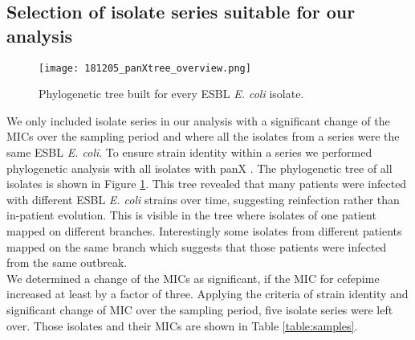 \subsection{Selection of isolate series suitable for our analysis}
\begin{figure}
	\texttt{[image: 181205\_panXtree\_overview.png]}
	\caption{Phylogenetic tree built for every ESBL \textit{E. coli} isolate.}
	\label{figure:panX}
\end{figure}
We only included isolate series in our analysis with a significant change of the MICs over the sampling period and where all the isolates from a series were the same ESBL \textit{E. coli}. To ensure strain identity within a series we performed phylogenetic analysis with all isolates with panX \cite{ding_panx:_2018}.    
The phylogenetic tree of all isolates is shown in Figure \ref{figure:panX}. This tree revealed that many patients were infected with different ESBL \textit{E. coli} strains over time, suggesting reinfection rather than in-patient evolution. This is visible in the tree where isolates of one patient mapped on different branches. Interestingly some isolates from different patients mapped on the same branch which suggests that those patients were infected from the same outbreak. \\
We determined a change of the MICs as significant, if the MIC for cefepime increased at least by a factor of three. Applying the criteria of strain identity and significant change of MIC over the sampling period, five isolate series were left over. Those isolates and their MICs are shown in Table \ref{table:samples}.
